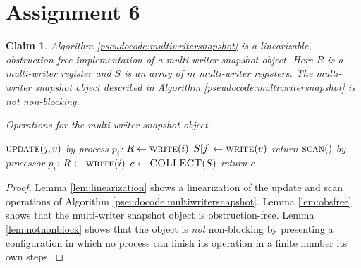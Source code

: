 \documentclass[11pt]{article}
\newcommand\writeF{\textsc{write}}
\newcommand\updateF{\textsc{update}}
\newcommand\scanF{\textsc{scan}}
\newcommand\COLLECT{\textsc{COLLECT}}
\newcommand\readF{\textsc{read}}
\newtheorem{claim}[theorem]{Claim}
\begin{document}
\rhead{\today}

\section*{Assignment 6}
\begin{claim}
Algorithm \ref{pseudocode:multiwritersnapshot} is a linearizable, obstruction-free implementation of a multi-writer snapshot object. Here $R$ is a multi-writer register and $S$ is an array of $m$ multi-writer registers. The multi-writer snapshot object described in Algorithm \ref{pseudocode:multiwritersnapshot} is not non-blocking.

\begin{algorithm}
	\caption{Operations for the multi-writer snapshot object.}
    \label{pseudocode:multiwritersnapshot}
    \begin{algorithmic}[1]
	\State $\updateF(j, v)$ by process $p_i$:
	\State $R \leftarrow \writeF(i)$
	\State $S[j] \leftarrow \writeF(v)$
	\State return
	\State
	\State $\scanF()$ by processor $p_i$:
	\Do 
		\State $R \leftarrow \writeF(i)$
		\State $c \leftarrow \COLLECT(S)$
	\doWhile{$\readF(R) \neq i$}
	\State return $c$
    \end{algorithmic}
\end{algorithm}
\end{claim}
\begin{proof}
Lemma \ref{lem:linearization} shows a linearization of the update and scan operations of Algorithm \ref{pseudocode:multiwritersnapshot}. Lemma \ref{lem:obsfree} shows that the multi-writer snapshot object is obstruction-free. Lemma \ref{lem:notnonblock} shows that the object is \emph{not} non-blocking by presenting a configuration in which no process can finish its operation in a finite number its own steps.
\end{proof}
\end{document}

